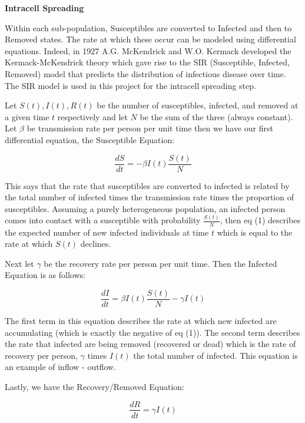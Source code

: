 \documentclass[a4paper]{article}
\begin{document}
\textbf{Intracell Spreading}

Within each sub-population, Susceptibles are converted to Infected and then to
Removed states. The rate at which these occur can be modeled using differential
equations. Indeed, in 1927 A.G. McKendrick and W.O. Kermack developed the
Kermack-McKendrick theory which gave rise to the SIR (Susceptible, Infected,
Removed) model that predicts the distribution of infectious disease over time.
The SIR model is used in this project for the intracell spreading step.

Let $S(t), I(t), R(t)$ be the number of susceptibles, infected, and removed at a 
given time $t$ respectively and let $N$ be the sum of the three (always
constant). Let $\beta$ be transmission rate per person per unit time then we
have our first differential equation, the Susceptible Equation:

\begin{equation}
  \frac{dS}{dt} = -\beta I(t) \frac{S(t)}{N}
\end{equation}

This says that the rate that susceptibles are converted to infected is related
by the total number of infected times the transmission rate times the proportion
of susceptibles. Assuming a purely heterogeneous population, an
infected person comes into contact with a susceptible with probability
$\frac{S(t)}{N}$, then eq (1) describes the expected number of new infected
individuals at time $t$ which is equal to the rate at which $S(t)$ declines.

Next let $\gamma$ be the recovery rate per person per unit time. Then the
Infected Equation is as follows:

\begin{equation}
  \frac{dI}{dt} = \beta I(t) \frac{S(t)}{N} - \gamma I(t)
\end{equation}

The first term in this equation describes the rate at which new infected are
accumulating (which is exactly the negative of eq (1)). The second term
describes the rate that infected are being removed (recovered or dead) which
is the rate of recovery per person, $\gamma$ times $I(t)$ the total number of
infected. This equation is an example of inflow - outflow.

Lastly, we have the Recovery/Removed Equation: 

\begin{equation}
  \frac{dR}{dt} = \gamma I(t)
\end{equation}
\end{document}
